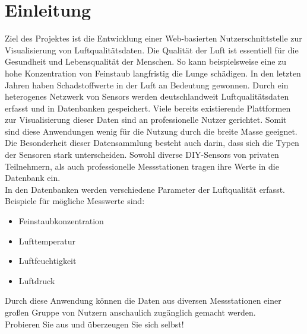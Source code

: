 \section{Einleitung}

Ziel des Projektes ist die Entwicklung einer Web-basierten Nutzerschnittstelle zur Visualisierung von Luftqualitätsdaten.
Die Qualität der Luft ist essentiell für die Gesundheit und Lebensqualität der Menschen. So kann beispielsweise eine zu hohe Konzentration von Feinstaub langfristig die Lunge schädigen. 
In den letzten Jahren haben Schadstoffwerte in der Luft an Bedeutung gewonnen.
Durch ein heterogenes Netzwerk von \glspl{Sensor} werden deutschlandweit Luftqualitätsdaten erfasst und in Datenbanken gespeichert.
Viele bereits existierende Plattformen zur Visualisierung dieser Daten sind an professionelle Nutzer gerichtet. Somit sind diese Anwendungen wenig für die Nutzung durch die breite Masse geeignet.
\\
Die Besonderheit dieser Datensammlung besteht auch darin, dass sich die Typen der Sensoren stark unterscheiden. Sowohl diverse \gls{DIY}-\glspl{Sensor} von privaten Teilnehmern, als auch professionelle Messstationen tragen ihre Werte in die Datenbank ein. 
\\
In den Datenbanken werden verschiedene Parameter der Luftqualität erfasst. Beispiele für mögliche Messwerte sind:
\begin{itemize} [noitemsep]
    \item \gls{Feinstaub}konzentration
    \item Lufttemperatur
    \item Luftfeuchtigkeit
    \item Luftdruck
\end{itemize}
Durch diese Anwendung können die Daten aus diversen Messstationen einer großen Gruppe von Nutzern anschaulich zugänglich gemacht werden.\\
Probieren Sie \softwarename aus und überzeugen Sie sich selbst!